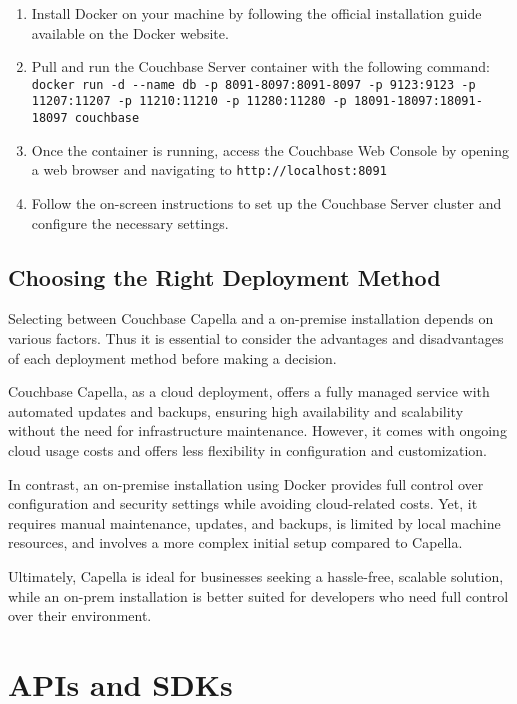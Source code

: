 \begin{enumerate}
  \item Install Docker on your machine by following the official installation guide available on the Docker website.
  \item Pull and run the Couchbase Server container with the following command: \\
  \lstinline|docker run -d --name db -p 8091-8097:8091-8097 -p 9123:9123 -p 11207:11207 -p 11210:11210 -p 11280:11280 -p 18091-18097:18091-18097 couchbase| 
  \item Once the container is running, access the Couchbase Web Console by opening a web browser and navigating to \lstinline|http://localhost:8091|
  \item Follow the on-screen instructions to set up the Couchbase Server cluster and configure the necessary settings.
\end{enumerate}
\cite{couchbaseDocker}

\section{Choosing the Right Deployment Method}
Selecting between Couchbase Capella and a on-premise installation depends on various factors. Thus it is essential to consider the advantages and disadvantages of each deployment method before making a decision.

Couchbase Capella, as a cloud deployment, offers a fully managed service with automated updates and backups, ensuring high availability and scalability without the need for infrastructure maintenance. However, it comes with ongoing cloud usage costs and offers less flexibility in configuration and customization. 

In contrast, an on-premise installation using Docker provides full control over configuration and security settings while avoiding cloud-related costs. Yet, it requires manual maintenance, updates, and backups, is limited by local machine resources, and involves a more complex initial setup compared to Capella. 

Ultimately, Capella is ideal for businesses seeking a hassle-free, scalable solution, while an on-prem installation is better suited for developers who need full control over their environment.



\chapter{APIs and SDKs}


